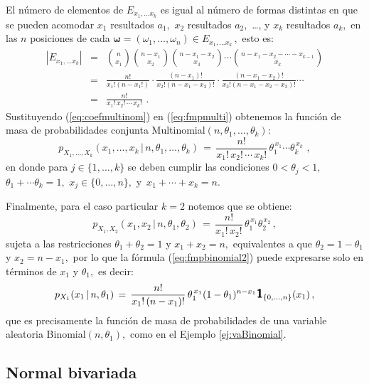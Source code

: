 \documentclass[spanish,10pt,letterpaper]{article}
\newcommand{\indic}{\textbf{\textsf{\large{1}}}}
\begin{document}
El número de elementos de $E_{x_1,\ldots x_k}$ es igual al número de formas distintas en que se pueden acomodar $x_1$ resultados $a_1,$ $x_2$ resultados $a_2,$ \ldots, y $x_k$ resultados $a_k,$ en las $n$ posiciones de cada $\boldsymbol{\omega}=(\omega_1,\ldots,\omega_n)\in E_{x_1,\ldots x_k}\,,$ esto es:
\begin{eqnarray}\label{eq:coefmultinom}
    |E_{x_1,\ldots x_k}| &=& \binom{n}{x_1}\binom{n-x_1}{x_2}\binom{n-x_1-x_2}{x_3}\cdots\binom{n-x_1-x_2-\cdots -x_{k-1}}{x_k} \nonumber \\
    &=& \frac{n!}{x_1!(n-x_1!)}\cdot\frac{(n-x_1)!}{x_2!(n-x_1-x_2)!}\cdot\frac{(n-x_1-x_2)!}{x_3!(n-x_1-x_2-x_3)!}\cdots \nonumber \\
    &=& \frac{n!}{x_1!\,x_2!\,\cdots\,x_k!} \,\,.
\end{eqnarray}
Sustituyendo (\ref{eq:coefmultinom}) en (\ref{eq:fmpmulti}) obtenemos la función de masa de probabilidades conjunta Multinomial$(n,\theta_1,\ldots,\theta_k):$
\begin{equation}\label{eq:fmpmultinom2}
    p_{X_1,\ldots,X_k}(x_1,\ldots,x_k\,|\,n,\theta_1,\ldots,\theta_k) \,=\, \frac{n!}{x_1!\,x_2!\,\cdots\,x_k!}\,\theta_1^{\,x_1}\cdots\theta_k^{\,x_k}\,\,,
\end{equation}
en donde para $j\in\{1,\ldots,k\}$ se deben cumplir las condiciones $0<\theta_j<1,$ $\theta_1+\cdots\theta_k=1,$ $x_j\in\{0,\ldots,n\},$ y $\,x_1+\cdots+x_k=n.$

\medskip 

Finalmente, para el caso particular $k=2$ notemos que se obtiene:
\begin{equation}\label{eq:fmpbinomial2}
    p_{X_1,X_2}(x_1,x_2\,|\,n,\theta_1,\theta_2) \,=\, \frac{n!}{x_1!\,x_2!}\,\theta_1^{\,x_1}\theta_2^{\,x_2}\,,
\end{equation}
sujeta a las restricciones $\theta_1+\theta_2=1$ y $x_1+x_2=n,$ equivalentes a que $\theta_2=1-\theta_1$ y $x_2=n-x_1,$ por lo que la fórmula (\ref{eq:fmpbinomial2}) puede expresarse solo en términos de $x_1$ y $\theta_1,$ es decir:
\begin{equation}\label{eq:fmpbinomial3}
    p_{X_1}(x_1\,|\,n,\theta_1) \,=\, \frac{n!}{x_1!\,(n-x_1)!}\,\theta_1^{\,x_1}(1-\theta_1)^{n-x_1}\indic_{\{0,\ldots,n\}}(x_1)\,,
\end{equation}
que es precisamente la función de masa de probabilidades de una variable aleatoria Binomial$(n,\theta_1),$ como en el Ejemplo \ref{ej:vaBinomial}.


\newpage 
\subsection{Normal bivariada}	
\end{document}

